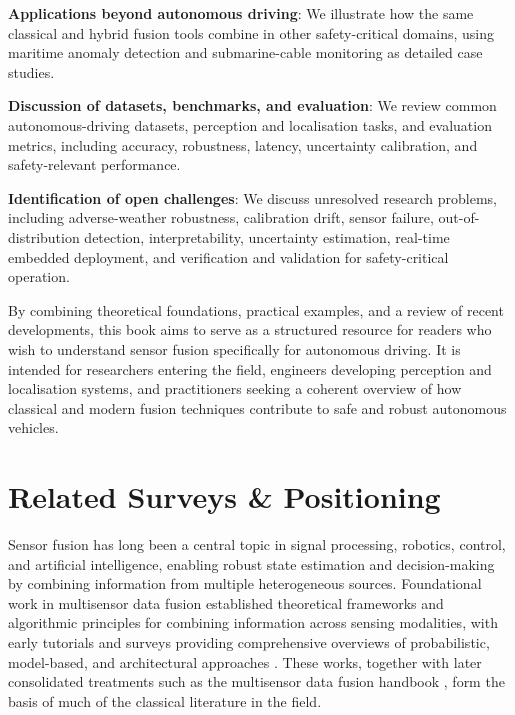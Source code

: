 \begin{list4a}
    \item \textbf{Applications beyond autonomous driving}: We illustrate how the same classical and hybrid fusion tools combine in other safety-critical domains, using maritime anomaly detection and submarine-cable monitoring as detailed case studies.
    \item \textbf{Discussion of datasets, benchmarks, and evaluation}: We review common autonomous-driving datasets, perception and localisation tasks, and evaluation metrics, including accuracy, robustness, latency, uncertainty calibration, and safety-relevant performance.
    \item \textbf{Identification of open challenges}: We discuss unresolved research problems, including adverse-weather robustness, calibration drift, sensor failure, out-of-distribution detection, interpretability, uncertainty estimation, real-time embedded deployment, and verification and validation for safety-critical operation.
\end{list4a}

By combining theoretical foundations, practical examples, and a review of recent developments, this book aims to serve as a structured resource for readers who wish to understand sensor fusion specifically for autonomous driving. It is intended for researchers entering the field, engineers developing perception and localisation systems, and practitioners seeking a coherent overview of how classical and modern fusion techniques contribute to safe and robust autonomous vehicles. 

\section{Related Surveys \& Positioning}
\label{subsec:related}

Sensor fusion has long been a central topic in signal processing, robotics, control, and artificial intelligence, enabling robust state estimation and decision-making by combining information from multiple heterogeneous sources. Foundational work in multisensor data fusion established theoretical frameworks and algorithmic principles for combining information across sensing modalities, with early tutorials and surveys providing comprehensive overviews of probabilistic, model-based, and architectural approaches \cite{hall_introduction_1997, luo_multisensor_1989}. These works, together with later consolidated treatments such as the multisensor data fusion handbook \cite{liggins_handbook_2009}, form the basis of much of the classical literature in the field.

